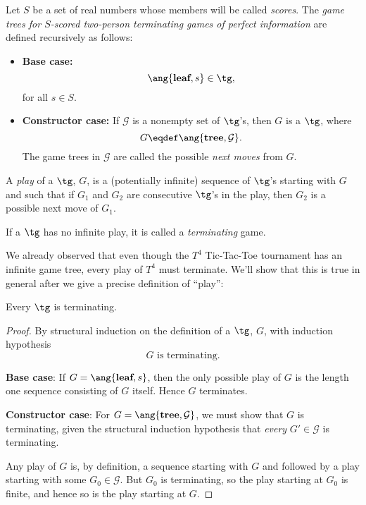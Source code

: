 \begin{definition}
\begin{definition}\label{tgdef}
  Let $S$ be a set of real numbers whose members will be called
  \emph{scores}. The \emph{game trees for $S$-scored two-person
    terminating games of perfect information} are defined recursively as
  follows:
\begin{itemize}

\item \textbf{Base case:}
\[
\ang{\textbf{leaf}, s} \in \tg,
\]
for all $s \in S$.

\item \textbf{Constructor case:}
If $\mathcal{G}$ is a nonempty set of
$\tg$'s, then $G$ is a $\tg$, where
\[
G \eqdef \ang{\textbf{tree},\mathcal{G}}.
\]
The game trees in $\mathcal{G}$ are called the possible \emph{next moves}
from $G$.
\end{itemize}

A \emph{play} of a $\tg$, $G$, is a (potentially infinite) sequence of
$\tg$'s starting with $G$ and such that if $G_1$ and $G_2$ are consecutive
$\tg$'s in the play, then $G_2$ is a possible next move of $G_1$.

If a $\tg$ has no infinite play, it is called a \emph{terminating} game.
\end{definition}

We already observed that even though the $T^4$ Tic-Tac-Toe tournament has
an infinite game tree, every play of $T^4$ must terminate.  We'll show
that this is true in general after we give a precise definition of
``play'':

\begin{theorem}
Every $\tg$ is terminating.
\end{theorem}

\begin{proof}
By structural induction on the definition of a $\tg$, $G$, with induction
hypothesis
\[
G \text{ is terminating}.
\]

\textbf{Base case}: If $G = \ang{\textbf{leaf}, s}$, then the only
possible play of $G$ is the length one sequence consisting of $G$ itself.
Hence $G$ terminates.

\textbf{Constructor case}: For $G = \ang{\textbf{tree},\mathcal{G}}$, we
must show that $G$ is terminating, given the structural induction
hypothesis that \emph{every} $G' \in \mathcal{G}$ is terminating.

Any play of $G$ is, by definition, a sequence starting with $G$ and
followed by a play starting with some $G_0 \in \mathcal{G}$.  But $G_0$ is
terminating, so the play starting at $G_0$ is finite, and hence so is the
play starting at $G$.


\end{proof}
\end{definition}
